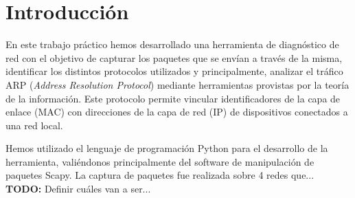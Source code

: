 \section{Introducción}

En este trabajo práctico hemos desarrollado una herramienta de diagnóstico de red con el objetivo de capturar los paquetes que se envían a través de la misma, identificar los distintos protocolos utilizados y principalmente, analizar el tráfico ARP (\textit{Address Resolution Protocol}) mediante herramientas provistas por la teoría de la información. Este protocolo permite vincular identificadores de la capa de enlace (MAC) con direcciones de la capa de red (IP) de dispositivos conectados a una red local.


Hemos utilizado el lenguaje de programación Python para el desarrollo de la herramienta, valiéndonos principalmente del software de manipulación de paquetes Scapy. La captura de paquetes fue realizada sobre 4 redes que... \textbf{TODO:} Definir cuáles van a ser...

